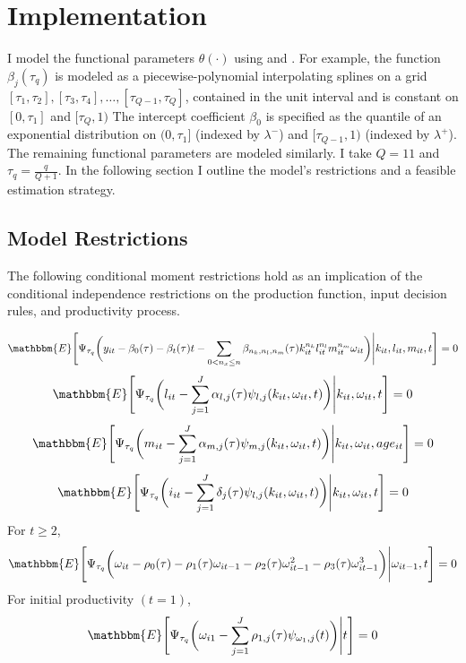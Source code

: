 \documentclass{article}
\begin{document}
\section{Implementation}
I model the functional parameters $\theta(\cdot)$ using \cite{Wei2009} and \cite{Arellano2016}. For example, the function $\beta_{j}(\tau_{q})$ is modeled as a piecewise-polynomial interpolating splines on a grid $[\tau_{1},\tau_{2}], [\tau_{3},\tau_{4}],\dots, [\tau_{Q-1},\tau_{Q}]$, contained in the unit interval and is constant on $[0, \tau_{1}]$ and $[\tau_{Q}, 1)$ The intercept coefficient $\beta_{0}$ is specified as the quantile of an exponential distribution on $(0,\tau_{1}]$ (indexed by $\lambda^{-}$) and $[\tau_{Q-1}, 1)$ (indexed by $\lambda^{+}$). The remaining functional parameters are modeled similarly. I take $Q=11$ and $\tau_{q}=\frac{q}{Q+1}$. In the following section I outline the model's restrictions and a feasible estimation strategy.

\subsection{Model Restrictions}
The following conditional moment restrictions hold as an implication of the conditional independence restrictions on the production function, input decision rules, and productivity process.

\begin{equation}\label{ymoment}
\mathbbm{E}\Bigg[\Psi_{\tau_{q}}\bigg(y_{it}-\beta_{0}(\tau)-\beta_{t}(\tau)t-\sum_{0<n_{x}\leq n}\beta_{n_{k}, n_{l}, n_{m}}(\tau)k_{it}^{n_{k}}l^{n_{l}}_{it}m^{n_{m}}_{it}\omega_{it}\bigg)\Bigg|k_{it}, l_{it}, m_{it}, t\Bigg]=0
\end{equation}
\begin{equation}\label{lmoment}
\mathbbm{E}\Bigg[\Psi_{\tau_{q}}\bigg(l_{it}-\sum_{j=1}^{J}\alpha_{l,j}(\tau)\psi_{l,j}(k_{it}, \omega_{it}, t)\bigg)\Bigg|k_{it}, \omega_{it}, t\Bigg]=0
\end{equation}
\begin{equation}\label{mmoment}
\mathbbm{E}\Bigg[\Psi_{\tau_{q}}\bigg(m_{it}-\sum_{j=1}^{J}\alpha_{m,j}(\tau)\psi_{m,j}(k_{it}, \omega_{it}, t)\bigg)\Bigg|k_{it}, \omega_{it}, age_{it}\Bigg]=0
\end{equation}
\begin{equation}\label{imoment}
\mathbbm{E}\Bigg[\Psi_{\tau_{q}}\bigg(i_{it}-\sum_{j=1}^{J}\delta_{j}(\tau)\psi_{l,j}(k_{it}, \omega_{it}, t)\bigg)\Bigg|k_{it}, \omega_{it}, t\Bigg]=0
\end{equation}
For $t\geq 2$,
\begin{equation}\label{omegamoment}
\mathbbm{E}\Bigg[\Psi_{\tau_{q}}\bigg(\omega_{it}-\rho_{0}(\tau)-\rho_{1}(\tau)\omega_{it-1}-\rho_{2}(\tau)\omega^{2}_{it-1}-\rho_{3}(\tau)\omega^{3}_{it-1}\bigg)\Bigg|\omega_{it-1}, t\Bigg]=0
\end{equation}
For initial productivity $(t=1)$,
\begin{equation}\label{omega1qmoment}
\mathbbm{E}\Bigg[\Psi_{\tau_{q}}\bigg(\omega_{i1}-\sum_{j=1}^{J}\rho_{1,j}(\tau)\psi_{\omega_{1},j}(t)\bigg)\Bigg|t\Bigg]=0
\end{equation}
\end{document}
